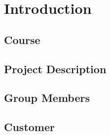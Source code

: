 
\chapter{Introduction}

\section{Course}

\section{Project Description}

\section{Group Members}

\section{Customer}

\cleardoublepage